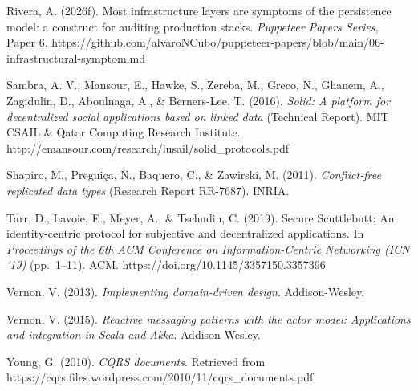 \documentclass[
]{article}
\begin{document}
Rivera, A. (2026f). Most infrastructure layers are symptoms of the
persistence model: a construct for auditing production stacks.
\emph{Puppeteer Papers Series}, Paper 6.
https://github.com/alvaroNCubo/puppeteer-papers/blob/main/06-infrastructural-symptom.md

Sambra, A. V., Mansour, E., Hawke, S., Zereba, M., Greco, N., Ghanem,
A., Zagidulin, D., Aboulnaga, A., \& Berners-Lee, T. (2016).
\emph{Solid: A platform for decentralized social applications based on
linked data} (Technical Report). MIT CSAIL \& Qatar Computing Research
Institute. http://emansour.com/research/lusail/solid\_protocols.pdf

Shapiro, M., Preguiça, N., Baquero, C., \& Zawirski, M. (2011).
\emph{Conflict-free replicated data types} (Research Report RR-7687).
INRIA.

Tarr, D., Lavoie, E., Meyer, A., \& Tschudin, C. (2019). Secure
Scuttlebutt: An identity-centric protocol for subjective and
decentralized applications. In \emph{Proceedings of the 6th ACM
Conference on Information-Centric Networking (ICN '19)} (pp.~1--11).
ACM. https://doi.org/10.1145/3357150.3357396

Vernon, V. (2013). \emph{Implementing domain-driven design}.
Addison-Wesley.

Vernon, V. (2015). \emph{Reactive messaging patterns with the actor
model: Applications and integration in Scala and Akka}. Addison-Wesley.

Young, G. (2010). \emph{CQRS documents}. Retrieved from
https://cqrs.files.wordpress.com/2010/11/cqrs\_documents.pdf
\end{document}
